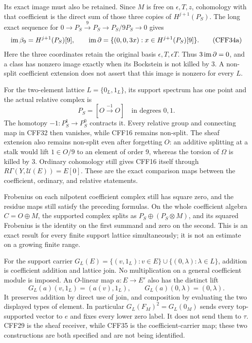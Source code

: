 Its exact image must also be retained. Since \(M\) is free
on \(\epsilon,T,z\), cohomology with that coefficient is
the direct sum of those three copies of \(H^{j+1}(P_S)\).
The long exact sequence for
\(0\to P_S\xrightarrow{9}P_S\to P_S/9P_S\to0\) gives
\[
 \operatorname{im}\beta_9=H^{j+1}(P_S)[9],\qquad
 \operatorname{im}\partial=\{(0,0,3x):x\in H^{j+1}(P_S)[9]\}.
 \tag{CFF34a}
\]
Here the three coordinates retain the original basis
\(\epsilon,T,\epsilon T\). Thus \(3\operatorname{im}\partial=0\), and
a class has nonzero image exactly when its Bockstein is
not killed by 3. A non-split coefficient extension does
not assert that this image is nonzero for every \(L\).

For the two-element lattice \(L=\{0_L,1_L\}\), its support
spectrum has one point and the actual relative complex is
\[
             P_S=[O\xrightarrow{-1}O]
             \quad\text{in degrees }0,1 .
 \tag{CFF34b}
\]
The homotopy \(-1:P_S^1\to P_S^0\) contracts it.
Every relative group and connecting map in CFF32 then
vanishes, while CFF16 remains non-split. The sheaf
extension also remains non-split even after forgetting \(O\):
an additive splitting at a stalk would lift \(1\in O/9\)
to an element of order 9, whereas the torsion of
\(\Omega\) is killed by 3. Ordinary cohomology still gives CFF16 itself
through \(R\Gamma(Y,\mathcal U(E))=E[0]\). These are the
exact comparison maps between the coefficient, ordinary,
and relative statements.

Frobenius on each nilpotent coefficient complex still
has square zero, and the residue maps still satisfy
the preceding formulas. On the whole coefficient
algebra \(C=O\oplus M\), the supported complex splits
as \(P_S\oplus(P_S\otimes M)\), and its squared
Frobenius is the identity on the first summand and
zero on the second. This is an exact result for every
finite support lattice simultaneously; it is not an
estimate on a growing finite range.

For the support carrier
\(G_L(E)=\{(v,1_L):v\in E\}\cup
\{(0,\lambda):\lambda\in L\}\), addition is coefficient
addition and lattice join. No multiplication on a
general coefficient module is imposed. An \(O\)-linear map
\(a:E\to E'\) also has the distinct lift
\[
 G_L(a)(v,1_L)=(a(v),1_L),\qquad
 G_L(a)(0,\lambda)=(0,\lambda).
 \tag{CFF35}
\]
It preserves addition by direct use of join, and
composition by evaluating the two displayed types
of element. In particular \(G_L(F_M)^2=G_L(0_M)\)
sends every top-supported vector to \(e\) and fixes
every lower zero label. It does not send them to
\(\tau\). CFF29 is the sheaf receiver, while CFF35 is
the coefficient-carrier map; these two constructions
are both specified and are not being identified.

